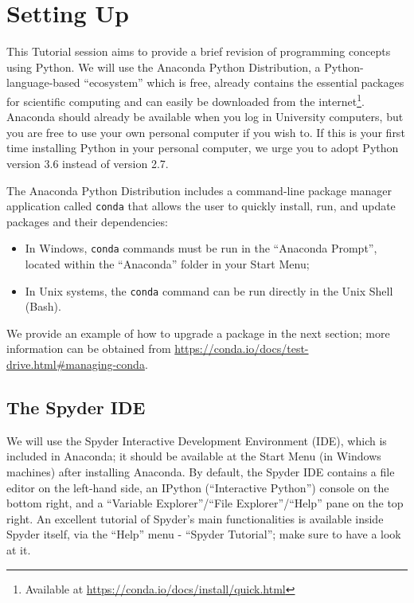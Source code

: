 \section{Setting Up}

This Tutorial session aims to provide a brief revision of programming concepts using Python. We will use the Anaconda Python Distribution, a Python-language-based ``ecosystem'' which is free, already contains the essential packages for scientific computing and can easily be downloaded from the internet\footnote{Available at \url{https://conda.io/docs/install/quick.html}}. Anaconda should already be available when you log in University computers, but you are free to use your own personal computer if you wish to. If this is your first time installing Python in your personal computer, we urge you to adopt Python version 3.6 instead of version 2.7.

The Anaconda Python Distribution includes a command-line package manager application called {\tt conda} that allows the user to quickly install, run, and update packages and their dependencies:

\begin{itemize}
	\item In Windows, {\tt conda} commands must be run in the ``Anaconda Prompt'', located within the ``Anaconda'' folder in your Start Menu;
	\item In Unix systems, the {\tt conda} command can be run directly in the Unix Shell (Bash).
\end{itemize}

We provide an example of how to upgrade a package in the next section; more information can be obtained from \url{https://conda.io/docs/test-drive.html#managing-conda}.

\subsection{The Spyder IDE}

We will use the Spyder Interactive Development Environment (IDE), which is included in Anaconda; it should be available at the Start Menu (in Windows machines) after installing Anaconda. By default, the Spyder IDE contains a file editor on the left-hand side, an IPython (``Interactive Python'') console on the bottom right, and a ``Variable Explorer''/``File Explorer''/``Help'' pane on the top right. An excellent tutorial of Spyder's main functionalities is available inside Spyder itself, via the ``Help'' menu - ``Spyder Tutorial''; make sure to have a look at it.

